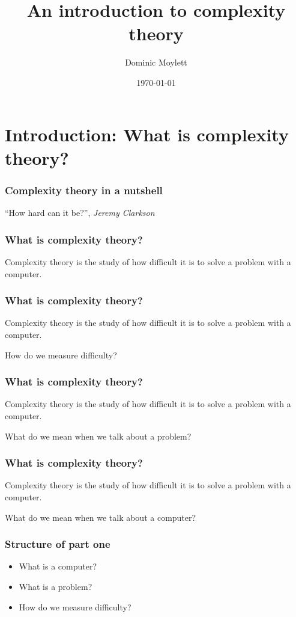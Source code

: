 \documentclass[aspectratio=169]{beamer}
\title[Complexity theory]{An introduction to complexity theory} %
\author{Dominic Moylett} %
\institute[University of Bristol] %
{
University of Bristol \\ %
\medskip
\textit{dominic.moylett@bristol.ac.uk} %
}
\date{\today} %
\begin{document}
\begin{frame}
\titlepage %
\end{frame}


\section{Introduction: What is complexity theory?}

\begin{frame}
\frametitle{Complexity theory in a nutshell}
\centerline{``How hard can it be?'', {\em Jeremy Clarkson}}
\end{frame}

\begin{frame}
\frametitle{What is complexity theory?}
Complexity theory is the study of how difficult it is to solve a problem with a computer.
\end{frame}

\begin{frame}
\frametitle{What is complexity theory?}
Complexity theory is the study of how {\color{red} difficult} it is to solve a problem with a computer.

How do we measure difficulty?
\end{frame}

\begin{frame}
\frametitle{What is complexity theory?}
Complexity theory is the study of how difficult it is to solve a {\color{red} problem} with a computer.

What do we mean when we talk about a problem?
\end{frame}

\begin{frame}
\frametitle{What is complexity theory?}
Complexity theory is the study of how difficult it is to solve a problem with a {\color{red} computer}.

What do we mean when we talk about a computer?
\end{frame}

\begin{frame}
\frametitle{Structure of part one}
\begin{itemize}
    \item What is a computer?
    \item What is a problem?
    \item How do we measure difficulty?
\end{itemize}
\end{frame}
\end{document}
